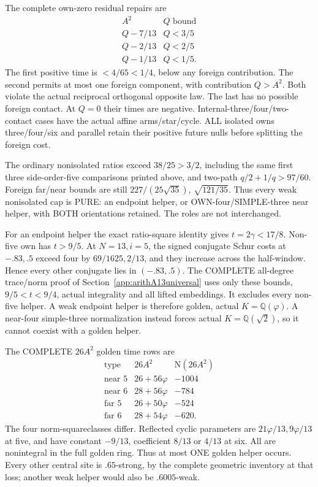 \documentclass[11pt]{article}
\begin{document}
The complete own-zero residual repairs are
\[
 \begin{array}{c|c}
 A^2&Q\text{ bound}\\ \hline
 Q-7/13&Q<3/5\\
 Q-2/13&Q<2/5\\
 Q-1/13&Q<1/5 .
 \end{array}
\]
The first positive time is \(<4/65<1/4\),
below any foreign contribution.
The second permits at most one foreign component,
with contribution \(Q>A^2\).
Both violate the actual reciprocal orthogonal
opposite law.
The last has no possible foreign contact.
At \(Q=0\) their times are negative.
Internal-three/four/two-contact cases have the
actual affine arms/star/cycle.
ALL isolated owns three/four/six and parallel
retain their positive future nulls before
splitting the foreign cost.

The ordinary nonisolated ratios exceed
\(38/25>3/2\), including the same first three
side-order-five comparisons printed above,
and two-path \(q/2+1/q>97/60\).
Foreign far/near bounds are still
\(227/(25\sqrt{35})\), \(\sqrt{121/35}\).
Thus every weak nonisolated cap is PURE:
an endpoint helper, or OWN-four/SIMPLE-three
near helper, with BOTH orientations retained.
The roles are not interchanged.

For an endpoint helper the exact ratio-square
identity gives \(t=2\gamma<17/8\).
Non-five own has \(t>9/5\).
At \(N=13,i=5\), the signed conjugate Schur
costs at \(-.83,.5\) exceed four by
\(69/1625,2/13\), and they increase across
the half-window.
Hence every other conjugate lies in
\((-.83,.5)\).
The COMPLETE all-degree trace/norm proof
of Section~\ref{app:arithA13universal} uses
only these bounds, \(9/5<t<9/4\), actual
integrality and all lifted embeddings.
It excludes every non-five helper.
A weak endpoint helper is therefore golden,
actual \(K=\mathbb Q(\varphi)\).
A near-four simple-three normalization instead
forces actual \(K=\mathbb Q(\sqrt2)\), so
it cannot coexist with a golden helper.

The COMPLETE \(26A^2\) golden time rows are
\[
\begin{array}{c|c|r}
 \text{type}&26A^2&\mathrm N(26A^2)\\ \hline
 \text{near }5&26+56\varphi&-1004\\
 \text{near }6&28+56\varphi&-784\\
 \text{far }5&26+50\varphi&-524\\
 \text{far }6&28+54\varphi&-620 .
\end{array}
\]
The four norm-squareclasses differ.
Reflected cyclic parameters are
\(21\varphi/13,9\varphi/13\) at five,
and have constant \(-9/13\), coefficient
\(8/13\) or \(4/13\) at six.
All are nonintegral in the full golden ring.
Thus at most ONE golden helper occurs.
Every other central site is \(.65\)-strong,
by the complete geometric inventory at that
loss; another weak helper would also be
\(.6005\)-weak.
\end{document}
